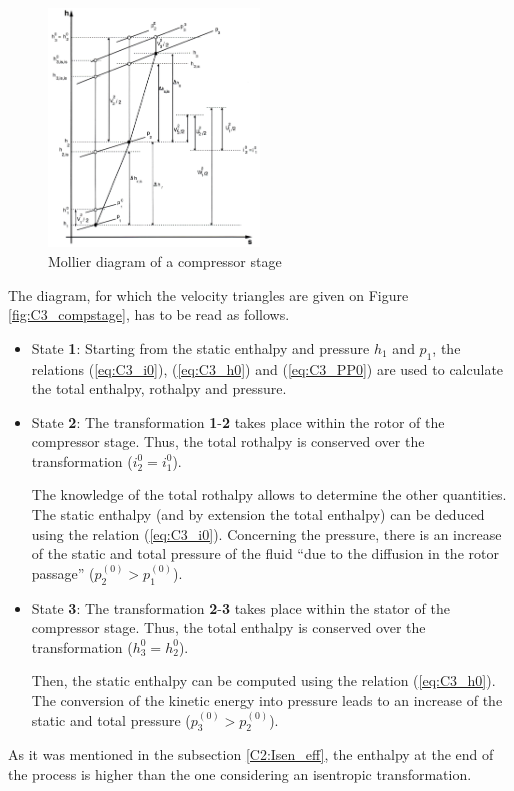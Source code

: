 \begin{figure}[h]
    \centering
    \includegraphics[width=0.5\textwidth]{Comp_mollier.png}
    \caption{Mollier diagram of a compressor stage \cite{Hillewaert2019}}
    \label{fig:C3_Molliercomp}
\end{figure}

The diagram, for which the velocity triangles are given on Figure \ref{fig:C3_compstage}, has to be read as follows.
\begin{itemize}
    \item State \textbf{1}: Starting from the static enthalpy and pressure \(h_1\) and \(p_1\), the relations (\ref{eq:C3_i0}), (\ref{eq:C3_h0}) and (\ref{eq:C3_PP0}) are used to calculate the total enthalpy, rothalpy and pressure.
    \item State \textbf{2}: The transformation \textbf{1}-\textbf{2} takes place within the rotor of the compressor stage. Thus, the total rothalpy is conserved over the transformation ($i_2^0=i_1^0$).

          The knowledge of the total rothalpy allows to determine the other quantities. The static enthalpy (and by extension the total enthalpy) can be deduced using the relation (\ref{eq:C3_i0}). Concerning the pressure, there is an increase of the static and total pressure of the fluid “due to the diffusion in the rotor passage” \cite{Hillewaert2019} ($p_2^{(0)} > p_1^{(0)}$).

    \item State \textbf{3}: The transformation \textbf{2}-\textbf{3} takes place within the stator of the compressor stage. Thus, the total enthalpy is conserved over the transformation ($h_3^0 = h_2^0$).

          Then, the static enthalpy can be computed using the relation (\ref{eq:C3_h0}). The conversion of the kinetic energy into pressure leads to an increase of the static and total pressure ($p_3^{(0)} > p_2^{(0)}$).
\end{itemize}
As it was mentioned in the subsection \ref{C2:Isen_eff}, the enthalpy at the end of the process is higher than the one considering an isentropic transformation.
